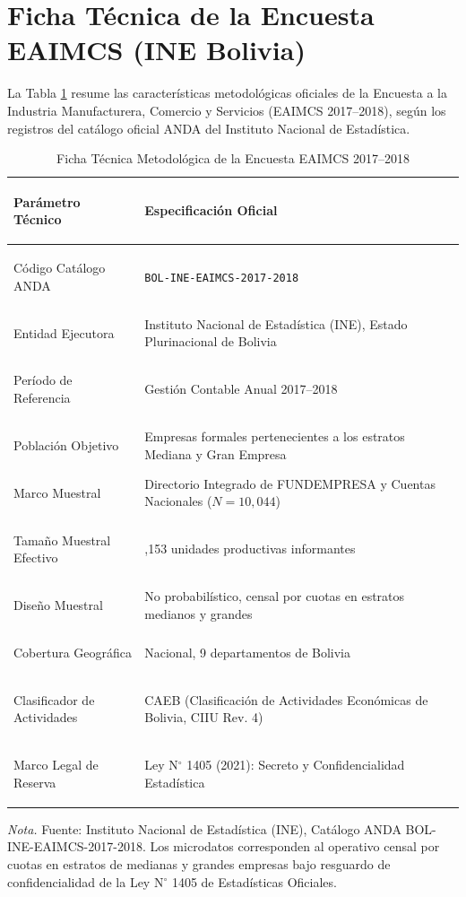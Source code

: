 \appendix
\section{Ficha Técnica de la Encuesta EAIMCS (INE Bolivia)}
\label{anexo:ficha_tecnica}

La Tabla \ref{tab:ficha_tecnica_eaimcs} resume las características metodológicas oficiales de la Encuesta a la Industria Manufacturera, Comercio y Servicios (EAIMCS 2017--2018), según los registros del catálogo oficial ANDA del Instituto Nacional de Estadística.

\begin{table}[htbp]
\centering
\caption{Ficha Técnica Metodológica de la Encuesta EAIMCS 2017--2018}
\label{tab:ficha_tecnica_eaimcs}
\footnotesize
\begin{tabularx}{\textwidth}{>{\bfseries\raggedright\arraybackslash}p{4.8cm} >{\raggedright\arraybackslash}X}
\toprule
\textbf{Parámetro Técnico} & \textbf{Especificación Oficial} \\
\midrule
Código Catálogo ANDA & \texttt{BOL-INE-EAIMCS-2017-2018} \\
Entidad Ejecutora & Instituto Nacional de Estadística (INE), Estado Plurinacional de Bolivia \\
Período de Referencia & Gestión Contable Anual 2017--2018 \\
Población Objetivo & Empresas formales pertenecientes a los estratos Mediana y Gran Empresa \\
Marco Muestral & Directorio Integrado de FUNDEMPRESA y Cuentas Nacionales ($N = 10,044$) \\
Tamaño Muestral Efectivo & 3,153 unidades productivas informantes \\
Diseño Muestral & No probabilístico, censal por cuotas en estratos medianos y grandes \\
Cobertura Geográfica & Nacional, 9 departamentos de Bolivia \\
Clasificador de Actividades & CAEB (Clasificación de Actividades Económicas de Bolivia, CIIU Rev. 4) \\
Marco Legal de Reserva & Ley N$^\circ$ 1405 (2021): Secreto y Confidencialidad Estadística \\
\bottomrule
\end{tabularx}
\vspace{2mm}
\raggedright\footnotesize
\textit{Nota.} Fuente: Instituto Nacional de Estadística (INE), Catálogo ANDA BOL-INE-EAIMCS-2017-2018. Los microdatos corresponden al operativo censal por cuotas en estratos de medianas y grandes empresas bajo resguardo de confidencialidad de la Ley N$^\circ$ 1405 de Estadísticas Oficiales.
\end{table}

